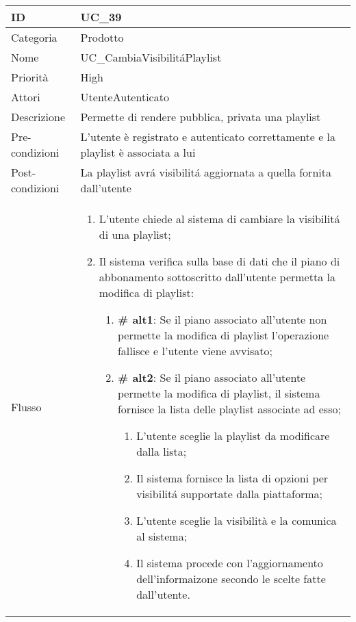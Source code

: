 \begin{center}
\begin{table}[bp]
\begin{tabular}{ |p{2cm}|p{13cm}|  }
\hline
ID & UC\_39\\\hline
Categoria & Prodotto \\\hline
Nome & UC\_CambiaVisibilit\'aPlaylist\\\hline
Priorità & High \\\hline
Attori &  UtenteAutenticato \\\hline
Descrizione & Permette di rendere pubblica, privata una playlist\\\hline
Pre-condizioni & L'utente è registrato e autenticato correttamente e la playlist è associata a lui\\\hline
Post-condizioni & La playlist avr\'a visibilit\'a aggiornata a quella fornita dall'utente\\\hline
Flusso &  	\begin{enumerate}
		\item L'utente chiede al sistema di cambiare la visibilit\'a di una playlist;
		\item Il sistema verifica sulla base di dati che il piano di abbonamento sottoscritto dall'utente permetta la modifica di playlist:
		 \begin{enumerate}[label*=\arabic*.]
			\item \textbf{\# alt1}: Se il piano associato all'utente non permette la modifica di playlist l'operazione fallisce e l'utente viene avvisato;
			\item \textbf{\# alt2}: Se il piano associato all'utente permette la modifica di playlist, il sistema  fornisce la lista delle playlist associate ad esso;
			\begin{enumerate}[label*=\arabic*.]
				\item L'utente sceglie la playlist da modificare dalla lista;
				\item Il sistema fornisce la lista di opzioni per visibilit\'a supportate dalla piattaforma;
				\item L'utente sceglie la visibilità e la comunica al sistema;
				\item Il sistema procede con l'aggiornamento dell'informaizone secondo le scelte fatte dall'utente.
			\end{enumerate}
					\end{enumerate}

		\end{enumerate}\\\hline
\end{tabular}
\label{table_use_case:39}\newline


\end{table}
\end{center}
